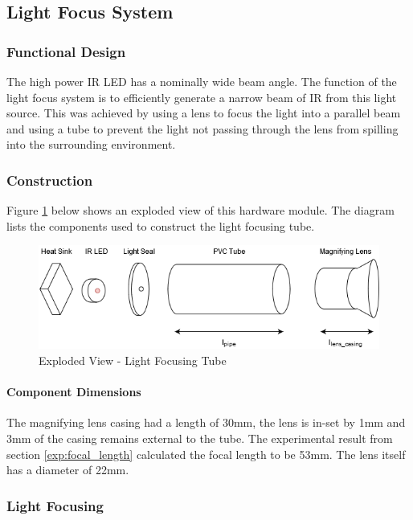 



\subsection{Light Focus System}

\subsubsection{Functional Design}
The high power IR LED has a nominally wide beam angle. The function of the light focus system is to efficiently generate a narrow beam of IR from this light source. This was achieved by using a lens to focus the light into a parallel beam and using a tube to prevent the light not passing through the lens from spilling into the surrounding environment.


\subsubsection{Construction}
Figure \ref{fig:light_focusing_tube} below shows an exploded view of this hardware module. The diagram lists the components used to construct the light focusing tube.

\begin{figure}[H]
	\centering
	\includegraphics[width=.8\textwidth]{figures/design/beam_tube.png}
	\caption{Exploded View - Light Focusing Tube}
	\label{fig:light_focusing_tube}
\end{figure}

\paragraph{Component Dimensions}
The magnifying lens casing had a length of 30mm, the lens is in-set by 1mm and 3mm of the casing remains external to the tube. The experimental result from section \ref{exp:focal_length} calculated the focal length to be 53mm. The lens itself has a diameter of 22mm.

\subsubsection{Light Focusing}

